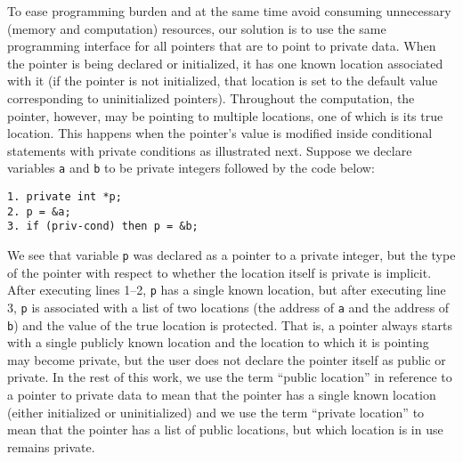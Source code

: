 \documentclass[11pt]{article}
\begin{document}
To ease programming burden and at the same time avoid consuming
unnecessary (memory and computation) resources, our solution is to use
the same programming interface for all pointers that are to point to
private data. When the pointer is being declared or initialized, it
has one known location associated with it (if the pointer is not
initialized, that location is set to the default value corresponding
to uninitialized pointers). Throughout the computation, the pointer,
however, may be pointing to multiple locations, one of which is
its true location. This happens when the pointer's value is modified
inside conditional statements with private conditions as illustrated
next. Suppose we declare variables \texttt{a} and \texttt{b} to be
private integers followed by the code below:

{\small \begin{verbatim}
1. private int *p;
2. p = &a;
3. if (priv-cond) then p = &b;
\end{verbatim}}
\noindent We see that variable \texttt{p} was declared as a pointer to
a private integer, but the type of the pointer with respect to whether
the location itself is private is implicit. After executing 
lines 1--2, \texttt{p} has a single known location,
but after executing line 3, \texttt{p} is associated with a list of
two locations (the address of \texttt{a} and the address of
\texttt{b}) and the value of the true location is protected. That
is, a pointer always starts with a single publicly known location and the
location to which it is pointing may become private, but the user does not
declare the pointer itself as public or private. In the
rest of this work, we use the term ``public location'' in reference to
a pointer to private data to mean that the pointer has a single known
location (either initialized or uninitialized) and we use the term
``private location'' to mean that the pointer has a list of public
locations, but which location is in use remains private.
\end{document}
